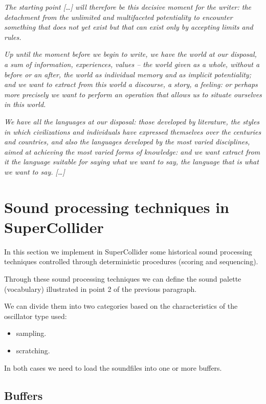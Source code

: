 \textit{The starting point {[}\ldots{]} will therefore be this decisive moment for the writer: the detachment from the unlimited and multifaceted potentiality to encounter something that does not yet exist but that can exist only by accepting limits and rules.}

\textit{Up until the moment before we begin to write, we have the world at our disposal, a sum of information, experiences, values -- the world given as a whole, without a before or an after, the world as individual memory and as implicit potentiality; and we want to extract from this world a discourse, a story, a feeling: or perhaps more precisely we want to
perform an operation that allows us to situate ourselves in this world.}

\textit{We have all the languages at our disposal: those developed by literature, the styles in which civilizations and individuals have expressed themselves over the centuries and countries, and also the languages developed by the most varied disciplines, aimed at achieving the most varied forms of knowledge: and we want extract from it the
language suitable for saying what we want to say, the language that is what we want to say. {[}\ldots{]} }   

\section{Sound processing techniques in SuperCollider}\label{sound-processing-techniques-in-supercollider}

In this section we implement in SuperCollider some historical sound processing techniques controlled through deterministic procedures (scoring and sequencing).

Through these sound processing techniques we can define the sound palette (vocabulary) illustrated in point 2 of the previous paragraph.

We can divide them into two categories based on the characteristics of the oscillator type used:

\begin{itemize}
\tightlist
\item sampling. 
\item scratching.
\end{itemize}

In both cases we need to load the soundfiles into one or more buffers.

\subsection{Buffers}\label{buffers}

